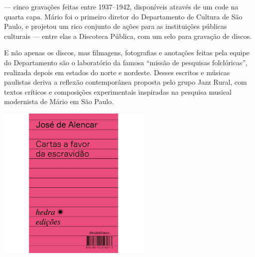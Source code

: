 \hspace*{-7cm}\hrulefill\hspace*{-7cm}

\medskip

\noindent{} --- cinco gravações feitas entre 1937--1942, disponíveis através de um  code na quarta capa. Mário foi o primeiro diretor do Departamento de Cultura de São Paulo, e projetou um rico conjunto de ações para as instituições públicas culturais --- entre elas a Discoteca Pública, com um selo para gravação de discos.

E não apenas os discos, mas filmagens, fotografias e anotações feitas pela equipe do Departamento são o laboratório da famosa “missão de pesquisas folclóricas”, realizada depois em estados do norte e nordeste. Desses escritos e músicas paulistas deriva a reflexão contemporânea proposta pelo grupo Jazz Rural, com textos críticos e composições experimentais inspiradas na pesquisa musical modernista de Mário em São Paulo.

\vfill

\hspace*{-.4cm}\begin{minipage}[c]{1\linewidth}
\small{
{}}
\end{minipage}

\pagebreak


\begin{center}
\hspace*{-3.6cm}
\hspace*{3.1cm}\includegraphics[width=74mm]{./grid/alencar.jpg}
\end{center}

